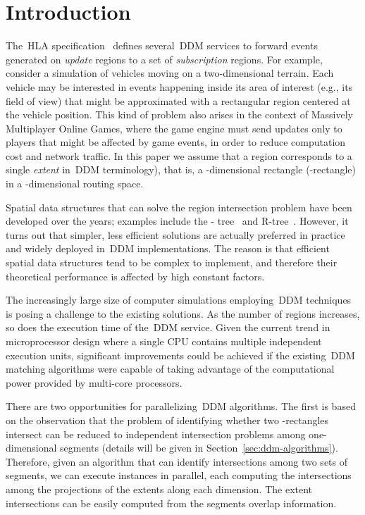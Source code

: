 \documentclass[10pt, conference, compsocconf]{IEEEtran}
\begin{document}
\section{Introduction}\label{sec:introduction}

The~\ac{HLA} specification~\cite{HLA} defines several~\ac{DDM}
services to forward events generated on \emph{update} regions to a set
of \emph{subscription} regions. For example, consider a simulation of
vehicles moving on a two-dimensional terrain. Each vehicle may be
interested in events happening inside its area of interest (e.g., its
field of view) that might be approximated with a rectangular region
centered at the vehicle position. This kind of problem also arises in
the context of Massively Multiplayer Online Games, where the game
engine must send updates only to players that might be affected by
game events, in order to reduce computation cost and network
traffic. In this paper we assume that a region corresponds to a single
\emph{extent} in~\ac{DDM} terminology), that is, a -dimensional
rectangle (-rectangle) in a -dimensional routing space.

Spatial data structures that can solve the region intersection problem
have been developed over the years; examples include the -
tree~\cite{Rosenberg1985} and R-tree~\cite{Guttman1984}. However, it
turns out that simpler, less efficient solutions are actually
preferred in practice and widely deployed in~\ac{DDM}
implementations. The reason is that efficient spatial data structures
tend to be complex to implement, and therefore their theoretical
performance is affected by high constant factors.

The increasingly large size of computer simulations employing~\ac{DDM}
techniques is posing a challenge to the existing solutions. As the
number of regions increases, so does the execution time of
the~\ac{DDM} service. Given the current trend in microprocessor design
where a single CPU contains multiple independent execution units,
significant improvements could be achieved if the existing~\ac{DDM}
matching algorithms were capable of taking advantage of the
computational power provided by multi-core processors.

There are two opportunities for parallelizing~\ac{DDM} algorithms.
The first is based on the observation that the problem of identifying
whether two -rectangles intersect can be reduced to  independent
intersection problems among one-dimensional segments (details will be
given in Section~\ref{sec:ddm-algorithms}). Therefore, given an
algorithm that can identify intersections among two sets of segments,
we can execute  instances in parallel, each computing the
intersections among the projections of the extents along each
dimension. The extent intersections can be easily computed from the
segments overlap information.
\end{document}

